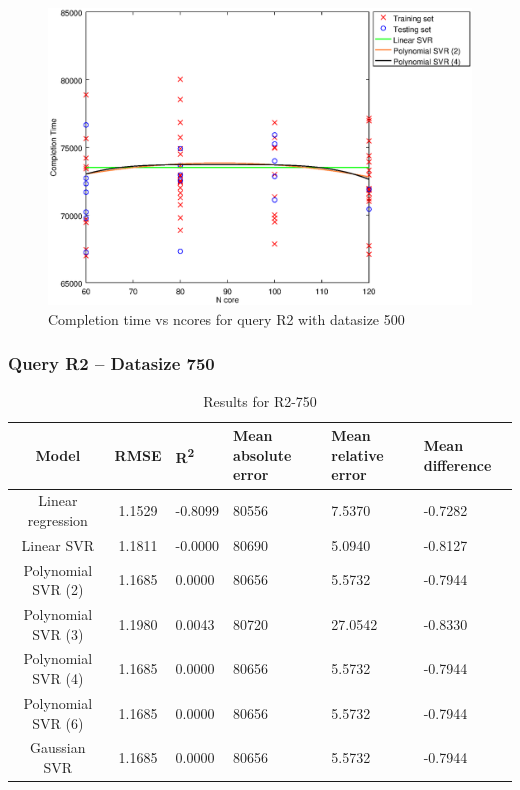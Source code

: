 \documentclass[a4paper,11pt]{article}
\begin{document}
\begin {figure}[hbtp]
\centering
\includegraphics[width=\textwidth]{output/R2_500_ONLY_1_LINEAR_NCORE/plot_R2_500_bestmodels.eps}
\caption{Completion time vs ncores for query R2 with datasize 500}
\label{fig:coreonly_linear_R2_500}
\end {figure}

\newpage
\subsubsection{Query R2 -- Datasize 750}
\begin{table}[H]
	\centering
	\begin{adjustbox}{center}
		\begin{tabular}{c | c M{1.2cm} M{2.5cm} M{2.5cm} M{1.8cm}}
			Model & RMSE & R\textsuperscript{2} & Mean absolute error & Mean relative error & Mean difference \tabularnewline
			\hline
			Linear regression & 1.1529 & -0.8099 &  80556 & 7.5370 & -0.7282 \\
			Linear SVR & 1.1811 & -0.0000 &  80690 & 5.0940 & -0.8127 \\
			Polynomial SVR (2) & 1.1685 & 0.0000 &  80656 & 5.5732 & -0.7944 \\
			Polynomial SVR (3) & 1.1980 & 0.0043 &  80720 & 27.0542 & -0.8330 \\
			Polynomial SVR (4) & 1.1685 & 0.0000 &  80656 & 5.5732 & -0.7944 \\
			Polynomial SVR (6) & 1.1685 & 0.0000 &  80656 & 5.5732 & -0.7944 \\
			Gaussian SVR & 1.1685 & 0.0000 &  80656 & 5.5732 & -0.7944 \\
		\end{tabular}
	\end{adjustbox}
	\\
	\caption{Results for R2-750}
	\label{fig:coreonly_linear_R2_750}
\end{table}
\end{document}
